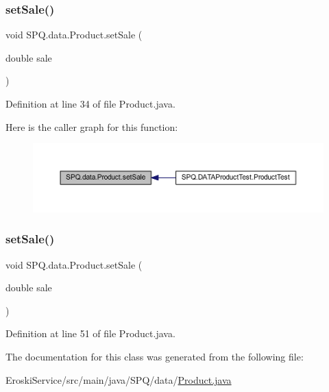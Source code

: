 \subsubsection{\texorpdfstring{set\+Sale()}{setSale()}\hspace{0.1cm}{\footnotesize\ttfamily [1/2]}}
{\footnotesize\ttfamily void S\+P\+Q.\+data.\+Product.\+set\+Sale (\begin{DoxyParamCaption}\item[{double}]{sale }\end{DoxyParamCaption})}



Definition at line 34 of file Product.\+java.

Here is the caller graph for this function\+:
\nopagebreak
\begin{figure}[H]
\begin{center}
\leavevmode
\includegraphics[width=350pt]{class_s_p_q_1_1data_1_1_product_ab7714f5e5a6f1b0a293ad7140c351c3c_icgraph}
\end{center}
\end{figure}
\mbox{\label{class_s_p_q_1_1data_1_1_product_ab7714f5e5a6f1b0a293ad7140c351c3c}} 
\subsubsection{\texorpdfstring{set\+Sale()}{setSale()}\hspace{0.1cm}{\footnotesize\ttfamily [2/2]}}
{\footnotesize\ttfamily void S\+P\+Q.\+data.\+Product.\+set\+Sale (\begin{DoxyParamCaption}\item[{double}]{sale }\end{DoxyParamCaption})}



Definition at line 51 of file Product.\+java.



The documentation for this class was generated from the following file\+:\begin{DoxyCompactItemize}
\item 
Eroski\+Service/src/main/java/\+S\+P\+Q/data/\mbox{\hyperlink{_eroski_service_2src_2main_2java_2_s_p_q_2data_2_product_8java}{Product.\+java}}\end{DoxyCompactItemize}
